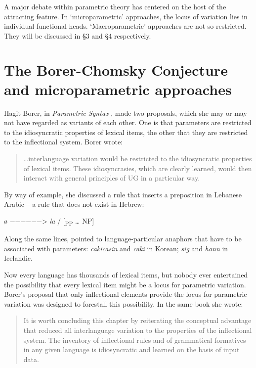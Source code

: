 \documentclass[output=paper,
modfonts
]{LSP/langsci}
\begin{document}
A major debate within parametric theory has centered on the host of the
attracting feature. In `microparametric' approaches, the locus of
variation lies in individual functional heads. `Macroparametric'
approaches are not so restricted. They will be discussed in §3 and §4
respectively.

\section{The Borer-Chomsky Conjecture and microparametric approaches}

Hagit Borer, in \emph{Parametric Syntax} \citep{borer1984}, made two
proposals, which she may or may not have regarded as variants of each
other. One is that parameters are restricted to the idiosyncratic
properties of lexical items, the other that they are restricted to the
inflectional system. Borer wrote:

\begin{quote}
\ldots{}interlanguage variation would be restricted to the idiosyncratic
properties of lexical items. These idiosyncrasies, which are clearly
learned, would then interact with general principles of UG in a
particular way. \citep[2--3]{borer1984}
\end{quote}

By way of example, she discussed a rule that inserts a preposition in
Lebanese Arabic  --  a rule that does not exist in Hebrew:

\ea
ø −−−−−−\textgreater{} \emph{la} / {[}\textsubscript{PP} \ldots{}
NP{]}
\z

Along the same lines, \citet{manzini1987} pointed to
language-particular anaphors that have to be associated with parameters:
\emph{cakicasin} and \emph{caki} in Korean; \emph{sig} and \emph{hann}
in Icelandic.

Now every language has thousands of lexical items, but nobody ever
entertained the possibility that every lexical item might be a locus for
parametric variation. Borer's proposal that only inflectional elements
provide the locus for parametric variation was designed to forestall
this possibility. In the same book she wrote:

\begin{quote}
It is worth concluding this chapter by reiterating the conceptual
advantage that reduced all interlanguage variation to the properties of
the inflectional system. The inventory of inflectional rules and of
grammatical formatives in any given language is idiosyncratic and
learned on the basis of input data. \citep[29]{borer1984}
\end{quote}
\end{document}
